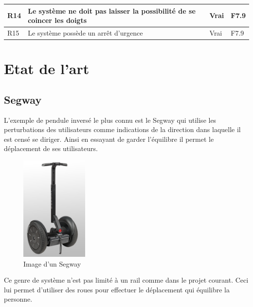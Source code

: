 \begin{table}[H]
{\begin{tabular}{|l|l|l|l|}
            R14                                                                                                                     & Le système ne doit pas laisser la possibilité de se coincer les doigts  & Vrai             & F7.9     \\ \hline
            R15                                                                                                                     & Le système possède un arrêt d'urgence                                   & Vrai             & F7.9     \\ \hline
        \end{tabular}%
    }
\end{table}

\section{Etat de l'art}\label{sec:EtatArt}

\subsection{Segway}

L'exemple de pendule inversé le plus connu est le Segway \cite{Segway} qui utilise les perturbations des utilisateurs comme indications de la direction dans laquelle il est censé se diriger. Ainsi en essayant de garder l'équilibre il permet le déplacement de ses utilisateurs.

\begin{figure}[H]
    \centering
    \includegraphics[width = 0.3\textwidth]{assets/figures/Segway.png}
    \caption{Image d'un Segway \cite{Segway}}
    \label{fig:Segway}
\end{figure}

Ce genre de système n'est pas limité à un rail comme dans le projet courant. Ceci lui permet d'utiliser des roues pour effectuer le déplacement qui équilibre la personne.

